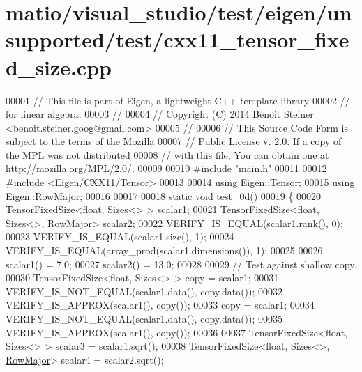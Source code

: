 \hypertarget{matio_2visual__studio_2test_2eigen_2unsupported_2test_2cxx11__tensor__fixed__size_8cpp_source}{}\section{matio/visual\+\_\+studio/test/eigen/unsupported/test/cxx11\+\_\+tensor\+\_\+fixed\+\_\+size.cpp}
\label{matio_2visual__studio_2test_2eigen_2unsupported_2test_2cxx11__tensor__fixed__size_8cpp_source}

\begin{DoxyCode}
00001 \textcolor{comment}{// This file is part of Eigen, a lightweight C++ template library}
00002 \textcolor{comment}{// for linear algebra.}
00003 \textcolor{comment}{//}
00004 \textcolor{comment}{// Copyright (C) 2014 Benoit Steiner <benoit.steiner.goog@gmail.com>}
00005 \textcolor{comment}{//}
00006 \textcolor{comment}{// This Source Code Form is subject to the terms of the Mozilla}
00007 \textcolor{comment}{// Public License v. 2.0. If a copy of the MPL was not distributed}
00008 \textcolor{comment}{// with this file, You can obtain one at http://mozilla.org/MPL/2.0/.}
00009 
00010 \textcolor{preprocessor}{#include "main.h"}
00011 
00012 \textcolor{preprocessor}{#include <Eigen/CXX11/Tensor>}
00013 
00014 \textcolor{keyword}{using} \hyperlink{class_eigen_1_1_tensor}{Eigen::Tensor};
00015 \textcolor{keyword}{using} \hyperlink{group__enums_ggaacded1a18ae58b0f554751f6cdf9eb13acfcde9cd8677c5f7caf6bd603666aae3}{Eigen::RowMajor};
00016 
00017 
00018 \textcolor{keyword}{static} \textcolor{keywordtype}{void} test\_0d()
00019 \{
00020   TensorFixedSize<float, Sizes<> > scalar1;
00021   TensorFixedSize<float, Sizes<>, \hyperlink{group__enums_ggaacded1a18ae58b0f554751f6cdf9eb13acfcde9cd8677c5f7caf6bd603666aae3}{RowMajor}> scalar2;
00022   VERIFY\_IS\_EQUAL(scalar1.rank(), 0);
00023   VERIFY\_IS\_EQUAL(scalar1.size(), 1);
00024   VERIFY\_IS\_EQUAL(array\_prod(scalar1.dimensions()), 1);
00025 
00026   scalar1() = 7.0;
00027   scalar2() = 13.0;
00028 
00029   \textcolor{comment}{// Test against shallow copy.}
00030   TensorFixedSize<float, Sizes<> > copy = scalar1;
00031   VERIFY\_IS\_NOT\_EQUAL(scalar1.data(), copy.data());
00032   VERIFY\_IS\_APPROX(scalar1(), copy());
00033   copy = scalar1;
00034   VERIFY\_IS\_NOT\_EQUAL(scalar1.data(), copy.data());
00035   VERIFY\_IS\_APPROX(scalar1(), copy());
00036 
00037   TensorFixedSize<float, Sizes<> > scalar3 = scalar1.sqrt();
00038   TensorFixedSize<float, Sizes<>, \hyperlink{group__enums_ggaacded1a18ae58b0f554751f6cdf9eb13acfcde9cd8677c5f7caf6bd603666aae3}{RowMajor}> scalar4 = scalar2.sqrt();

\end{DoxyCode}
